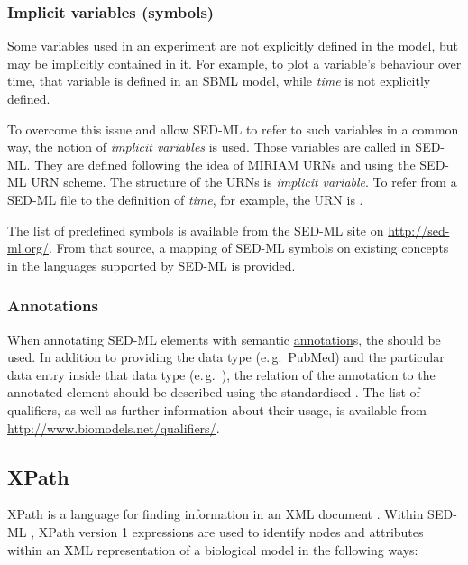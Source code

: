\subsubsection{Implicit variables (symbols)}
\label{sec:implicitVariable}

Some variables used in an experiment are not explicitly defined in the model, but may be implicitly contained in it. For example, to plot a variable's behaviour over time, that variable is defined in an SBML model, while \emph{time} is not explicitly defined. 

To overcome this issue and allow SED-ML to refer to such variables in a common way, the notion of \emph{implicit variables} is used. Those variables are called  in SED-ML. They are defined following the idea of MIRIAM URNs and using the SED-ML URN scheme. The structure of the URNs is \emph{implicit variable}. To refer from a SED-ML file to the definition of \emph{time}, for example, the URN is .

The list of predefined symbols is available from the SED-ML site on \url{http://sed-ml.org/}.
From that source, a mapping of SED-ML symbols on existing concepts in the languages supported by SED-ML is provided.

\subsubsection{Annotations}
\label{sec:annotations}
When annotating SED-ML elements with semantic \hyperref[class:annotation]{annotation}s, the  should be used. In addition to providing the data type (e.\,g.\ PubMed) and the particular data entry inside that data type (e.\,g.\ ), the relation of the annotation to the annotated element should be described using the standardised . The list of qualifiers, as well as further information about their usage, is available from \url{http://www.biomodels.net/qualifiers/}.


\subsection{XPath}  
\label{sec:xpath}
XPath is a language for finding information in an XML document \citep{xpath:1999}. Within SED-ML \currentLV, XPath version 1 expressions are used to identify nodes and attributes within an XML representation of a biological model in the following ways:

